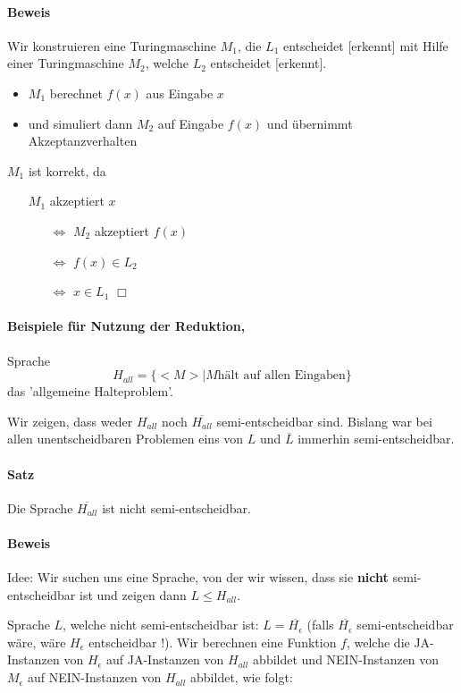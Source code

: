 \paragraph*{Beweis} Wir konstruieren eine Turingmaschine $M_1$, die $L_1$ entscheidet [erkennt] mit Hilfe einer Turingmaschine $M_2$, welche $L_2$ entscheidet [erkennt].
\begin{itemize}
	\item $M_1$ berechnet $f(x)$ aus Eingabe $x$
	\item und simuliert dann $M_2$ auf Eingabe $f(x)$ und übernimmt Akzeptanzverhalten
\end{itemize}
$M_1$ ist korrekt, da
\begin{itemize}
	\item[] $M_1$ akzeptiert $x$
	\begin{itemize}
		\item[$\Leftrightarrow$] $M_2$ akzeptiert $f(x)$
		\item[$\Leftrightarrow$] $f(x) \in L_2$
		\item[$\Leftrightarrow$] $x \in L_1$ $\Box$
	\end{itemize}
\end{itemize}

\paragraph*{Beispiele für Nutzung der Reduktion,} Sprache $$ H_{all} = \{ <M>|M \text{hält auf allen Eingaben} \} $$ das 'allgemeine Halteproblem'.

\para{} Wir zeigen, dass weder $H_{all}$ noch $\overline{H_{all}}$ semi-entscheidbar sind. Bislang war bei allen unentscheidbaren Problemen eins von $L$ und $\overline{L}$ immerhin semi-entscheidbar.

\paragraph*{Satz} Die Sprache $\overline{H_{all}}$ ist nicht semi-entscheidbar.

\paragraph*{Beweis} Idee: Wir suchen uns eine Sprache, von der wir wissen, dass sie \textbf{nicht} semi-entscheidbar ist und zeigen dann $L \leq H_{all}$.

\para{} Sprache $L$, welche nicht semi-entscheidbar ist: $L=\overline{H_\epsilon}$ (falls $\overline{H_\epsilon}$ semi-entscheidbar wäre, wäre $H_\epsilon$ entscheidbar !). %
Wir berechnen eine Funktion $f$, welche die JA-Instanzen von $H_\epsilon$ auf JA-Instanzen von $H_{all}$ abbildet und NEIN-Instanzen von $M_\epsilon$ auf NEIN-Instanzen von $H_{all}$ abbildet, wie folgt:

